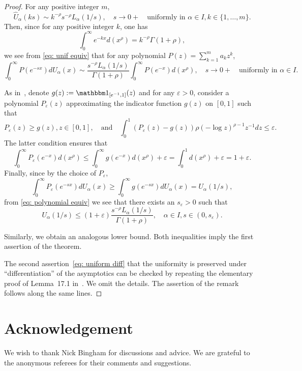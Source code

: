 \documentclass[12pt, reqno]{amsart}
\begin{document}
\begin{proof}
For any positive integer $m$, 
\begin{equation}
\label{eq: unif equiv}
\hat{U}_\alpha(ks) \sim  k^{-\rho} s^{-\rho} L_\alpha(1/s), \quad s \to 0+ \quad \text{uniformly in } \alpha \in I, k \in \{1, \ldots, m\}.
\end{equation} 
Then, since for any positive integer $k$, one has
$$\int_{0}^\infty e^{-kx} d(x^\rho) = k^{-\rho} \Gamma(1+ \rho),$$
we see from \eqref{eq: unif equiv} that for any polynomial $P(z)=\sum_{k=1}^m a_k z^k$,
\begin{equation}
\label{eq: polynomial equiv}
\int_{0}^\infty P(e^{-sx}) dU_\alpha(x) \sim  \frac{s^{-\rho} L_\alpha(1/s)}{\Gamma(1+\rho)} \int_0^\infty P(e^{-x}) d (x^\rho) , \quad s \to 0+ \quad \text{uniformly in } \alpha \in I.
\end{equation}

As in~\cite[Theorem I.15.3]{Korevaar}, denote $g(z):=\I_{[e^{-1},1]}(z)$ and for any $\varepsilon >0$, consider a polynomial $P_\varepsilon(z)$ approximating the indicator function $g(z)$ on $[0,1]$ such that 
$$P_\varepsilon(z) \ge g(z), z \in [0,1], \quad \text{and} \quad \int_0^1 (P_\varepsilon(z) - g(z))  \rho (-\log z)^{\rho -1} z^{-1} dz \le \varepsilon.$$ The latter condition ensures that
$$\int_0^\infty P_\varepsilon(e^{-x}) d(x^\rho) \le  \int_0^\infty g(e^{-x}) d(x^\rho)  + \varepsilon  = \int_0^1 d (x^\rho) + \varepsilon = 1 + \varepsilon.$$ Finally, since by the choice of $P_\varepsilon$,
$$\int_{0}^\infty P_\varepsilon(e^{-sx}) dU_\alpha(x) \ge \int_{0}^\infty g(e^{-sx}) dU_\alpha(x) = U_\alpha(1/s),$$ from \eqref{eq: polynomial equiv} we see that there exists an $s_\varepsilon>0$ such that
$$U_\alpha(1/s) \le (1 + \varepsilon) \frac{s^{-\rho} L_\alpha(1/s)}{\Gamma(1+\rho)},  \quad \alpha \in I, s \in (0, s_\varepsilon).$$ 

Similarly, we obtain an analogous lower bound. Both inequalities imply the first assertion of the theorem. 

The second assertion~\eqref{eq: uniform diff} that the uniformity is preserved under ``differentiation'' of the asymptotics can be checked by repeating the elementary proof of Lemma~17.1 in~\cite{Korevaar}. We omit the details. The assertion of the remark follows along the same lines.

\end{proof}

\section*{Acknowledgement}
We wish to thank Nick Bingham for discussions and advice. We are grateful to the anonymous referees for their comments and suggestions.



\end{document}
